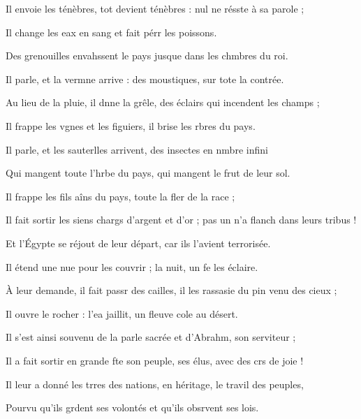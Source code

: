 \item Il envoie les ténèbres, tot devient ténèbres :\psstar{} nul ne résste à sa parole ;
\item Il change les eax en sang\psstar{} et fait pérr les poissons.
\item Des grenouilles envahssent le pays\psstar{} jusque dans les chmbres du roi.
\item Il parle, et la vermne arrive :\psstar{} des moustiques, sur tote la contrée.
\item Au lieu de la pluie, il dnne la grêle,\psstar{} des éclairs qui incendent les champs ;
\item Il frappe les vgnes et les figuiers,\psstar{} il brise les rbres du pays.
\item Il parle, et les sauterlles arrivent,\psstar{} des insectes en nmbre infini
\item Qui mangent toute l’hrbe du pays,\psstar{} qui mangent le frut de leur sol.
\item Il frappe les fils aîns du pays,\psstar{} toute la fler de la race ;
\item Il fait sortir les siens chargs d’argent et d’or ;\psstar{} pas un n’a flanch dans leurs tribus !
\item Et l’Égypte se réjout de leur départ,\psstar{} car ils l’avient terrorisée.
\item Il étend une nue pour les couvrir ;\psstar{} la nuit, un fe les éclaire.
\item À leur demande, il fait passr des cailles,\psstar{} il les rassasie du pin venu des cieux ;
\item Il ouvre le rocher : l’ea jaillit,\psstar{} un fleuve cole au désert.
\item Il s’est ainsi souvenu de la parle sacrée\psstar{} et d’Abrahm, son serviteur ;
\item Il a fait sortir en grande fte son peuple,\psstar{} ses élus, avec des crs de joie !
\item Il leur a donné les trres des nations,\psstar{} en héritage, le travil des peuples,
\item Pourvu qu’ils grdent ses volontés\psstar{} et qu’ils obsrvent ses lois.